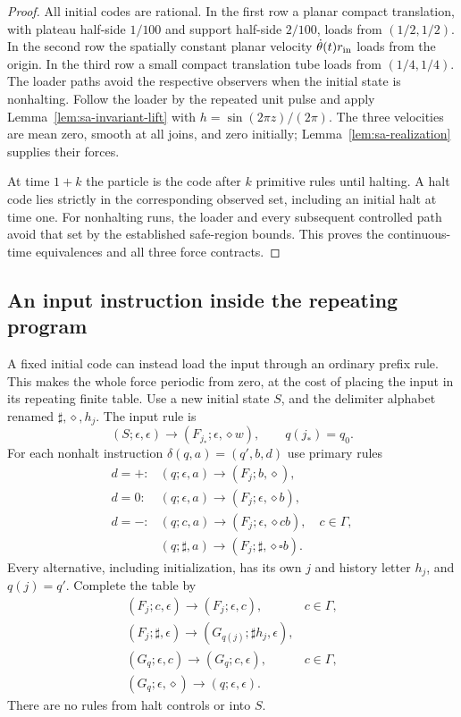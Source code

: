 \begin{proof}
All initial codes are rational.  In the first row a planar compact
translation, with plateau half-side $1/100$ and support half-side $2/100$,
loads from $(1/2,1/2)$.  In the second row the spatially constant planar
velocity $\dot\theta(t)r_{\rm in}$ loads from the origin.  In the third
row a small compact translation tube loads from $(1/4,1/4)$.
The loader paths avoid the respective observers when the initial state
is nonhalting.  Follow the loader by the repeated unit pulse and apply
Lemma~\ref{lem:sa-invariant-lift} with $h=\sin(2\pi z)/(2\pi)$.
The three velocities are mean zero, smooth at all joins, and zero
initially; Lemma~\ref{lem:sa-realization} supplies their forces.

At time $1+k$ the particle is the code after $k$ primitive rules until
halting.  A halt code lies strictly in the corresponding observed set,
including an initial halt at time one.  For nonhalting runs, the loader
and every subsequent controlled path avoid that set by the established
safe-region bounds.  This proves the continuous-time equivalences and
all three force contracts.
\end{proof}

\subsection{An input instruction inside the repeating program}
\label{subsec:sa-prefix-insertion}
A fixed initial code can instead load the input through an ordinary
prefix rule.  This makes the whole force periodic from zero, at the cost
of placing the input in its repeating finite table.
Use a new initial state $S$, and the delimiter alphabet renamed
$\sharp,\diamond,h_j$.  The input rule is
\[
 (S;\epsilon,\epsilon)\to(F_{j_*};\epsilon,\diamond w),
 \qquad q(j_*)=q_0.
\]
For each nonhalt instruction $\delta(q,a)=(q',b,d)$ use primary rules
\[
\begin{array}{ll}
 d=+:&(q;\epsilon,a)\to(F_j;b,\diamond),\\
 d=0:&(q;\epsilon,a)\to(F_j;\epsilon,\diamond b),\\
 d=-:&(q;c,a)\to(F_j;\epsilon,\diamond cb),\quad c\in\Gamma,\\
     &(q;\sharp,a)\to(F_j;\sharp,\diamond\square b).
\end{array}
\]
Every alternative, including initialization, has its own $j$ and history
letter $h_j$, and $q(j)=q'$.  Complete the table by
\begin{equation}\label{eq:sa-prefix-insertion-scans}
\begin{array}{ll}
 (F_j;c,\epsilon)\to(F_j;\epsilon,c),&c\in\Gamma,\\
 (F_j;\sharp,\epsilon)\to(G_{q(j)};\sharp h_j,\epsilon),\\
 (G_q;\epsilon,c)\to(G_q;c,\epsilon),&c\in\Gamma,\\
 (G_q;\epsilon,\diamond)\to(q;\epsilon,\epsilon).
\end{array}
\end{equation}
There are no rules from halt controls or into $S$.

